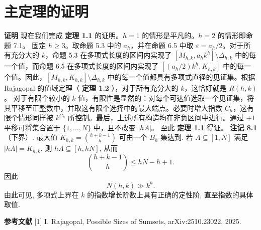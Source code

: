 \documentclass[11pt]{article}
\theoremstyle{break}
\begin{document}
\section{主定理的证明}
\textbf{证明}
现在我们完成
\textbf{定理 1.1}
的证明。$h=1$ 的情形是平凡的。$h=2$ 的情形即命题 7.1。
固定 $h \ge 3$。取命题 5.3 中的 $a_h$，并在命题 6.5 中取 $\varepsilon = a_h/2$。对于所有充分大的 $k$，命题 5.3 在多项式长度的区间内实现了 $[M_{h,k}, a_h k^h] \setminus \Delta_{h,k}$ 中的每一个值，而命题 6.5 在多项式长度的区间内实现了 $[(a_h/2)k^h, K_{h,k}]$ 中的每一个值。因此，$[M_{h,k}, K_{h,k}] \setminus \Delta_{h,k}$ 中的每一个值都具有多项式直径的见证集。根据 Rajagopal 的值域定理（
\textbf{定理 1.2}
），对于所有充分大的 $k$，这恰好就是 $R(h,k)$。
对于有限个较小的 $k$ 值，有限性是显然的：对每个可达值选取一个见证集，将其平移至正整数中，并取这有限个选择中的最大端点。必要时增大指数 $C_h$，这有限个情形同样被 $k^{C_h}$ 所控制。最后，上述所有构造均在非负区间中进行。通过 $+1$ 平移可将集合置于 $\{1,\dots,N\}$ 中，且不改变 $|hA|$。
至此
\textbf{定理 1.1}
得证。
\textbf{注记 8.1}（下界）.
最大值 $K_{h,k} = \binom{h+k-1}{h}$ 可由一个 $B_h$-集达到. 若 $A \subseteq [1,N]$ 满足 $|hA| = K_{h,k}$, 则 $hA \subseteq [h, hN]$, 从而
\[ \binom{h+k-1}{h} \le hN - h + 1. \]
因此
\[ N(h,k) \gg k^h. \]
由此可见, 多项式上界在 $k$ 的指数增长阶数上具有正确的定性阶, 直至指数的具体取值.

\textbf{参考文献}
[1] I. Rajagopal, Possible Sizes of Sumsets, arXiv:2510.23022, 2025.
\end{document}
